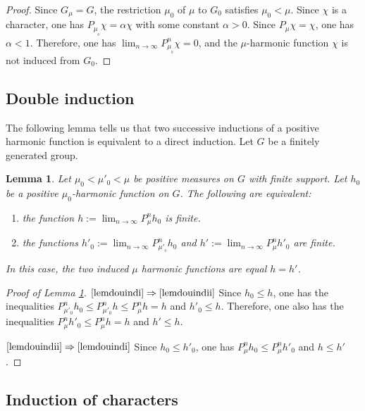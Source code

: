\documentclass[11pt]{article}
\newcommand{\skpt}{\smallskip}
\numberwithin{equation}{section}
\newenvironment{enumeratei}
{\bgroup\def\theenumi{\roman{enumi}}\def\theenumii{\arabic{enumii}}\begin{enumerate}}
{\end{enumerate}\egroup}
\newtheorem{Lem}[Thm]{Lemma}
\theoremstyle{definition}
\let\al\alpha
\let\bq\relax
\let\eq\relax
\let\ra\to
\begin{document}
\begin{proof}
Since $G_\mu=G$, the restriction $\mu_0$ of $\mu$ to $G_0$ satisfies $\mu_0<\mu$. Since $\chi$ is a character, one has $P_{\mu_{_0}}\chi =\al \chi$ with some constant $\al>0$.
Since $P_\mu\chi=\chi$, one has $\al<1$.
Therefore, one has $\lim_{n\ra\infty}P^n_{\mu_{_0}}\chi=0$, and
the $\mu$-harmonic function $\chi$ is not induced
from $G_0$.
\end{proof}

\subsection{Double induction}
\label{secdouind}

\bq
The following lemma
tells us that two successive inductions
of a positive harmonic function is equivalent to a direct induction.
\eq
Let $G$ be a finitely generated group.

\begin{Lem}
\label{lemdouind}
Let
$\mu_0<\mu'_0<\mu$ be positive measures on $G$ with finite support.
Let $h_0$ be a positive $\mu_0$-harmonic function on $G$.
The following are equivalent:
\begin{enumeratei}
\item\label{lemdouindi}
the function
$h:=\lim_{n\ra\infty}P^n_{\mu}h_0$ is finite.
\item\label{lemdouindii}
the functions
$h'_0:=\lim_{n\ra\infty}P^n_{\mu'_{_0}}h_0$ and
$h':=\lim_{n\ra\infty}P^n_{\mu}h'_0$ are finite.
\end{enumeratei}
\noindent
In this case, the two induced $\mu$ harmonic functions are equal $h=h'$.
\end{Lem}

\skpt
\begin{proof}[Proof of Lemma \ref{lemdouind}]
$\eqref{lemdouindi}\Rightarrow\eqref{lemdouindii}$
Since $h_0\leq h$, one has the inequalities
$P^n_{\mu'_0}h_0\leq P^n_{\mu'_0}h\leq P^n_{\mu}h= h$ and $h'_0\leq h$.
Therefore, one also has the inequalities $P^n_{\mu}h'_0\leq P^n_{\mu}h= h$ and $h'\leq h$.

$\eqref{lemdouindii} \Rightarrow\eqref{lemdouindi}$
Since $h_0\leq h'_0$, one has $P^n_{\mu}h_0\leq P^n_{\mu}h'_0$ and $h\leq h'$.
\end{proof}

\subsection{Induction of characters}
\label{secindcha}
\end{document}
